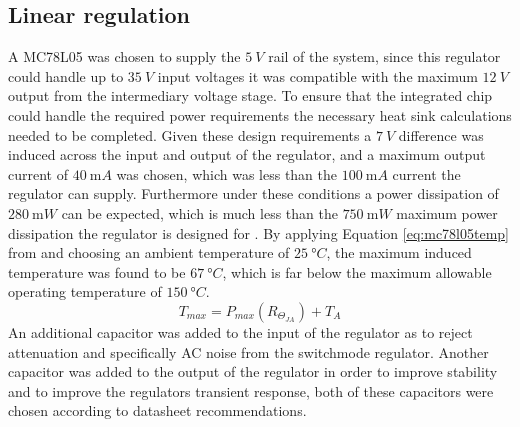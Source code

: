 \subsection{Linear regulation}
A MC78L05 was chosen to supply the $\SI{5}{V}$ rail of the system, since this regulator could handle up to $\SI{35}{V}$ input voltages it was compatible with the maximum $\SI{12}{V}$ output from the intermediary voltage stage. To ensure that the integrated chip could handle the required power requirements the necessary heat sink calculations needed to be completed. \newline 
Given these design requirements a $\SI{7}{V}$ difference was induced across the input and output of the regulator, and a maximum output current of $\SI{40}{\milli A}$ was chosen, which was less than the $\SI{100}{\milli A}$ current the regulator can supply. Furthermore under these conditions a power dissipation of $\SI{280}{\milli W}$ can be expected, which is much less than the $\SI{750}{\milli W}$ maximum power dissipation the regulator is designed for \cite{reg78L05:2002}. By applying Equation \ref{eq:mc78l05temp} from \cite{Perold:2019} and choosing an ambient temperature of $\SI{25}{\degree C}$, the maximum induced temperature was found to be $\SI{67}{\degree C}$, which is far below the maximum allowable operating temperature of $\SI{150}{\degree C}$.\newline
\begin{equation}
   T_{max} = P_{max}(R_{\Theta _{JA}}) + T_{A}
   \label{eq:mc78l05temp}
\end{equation}
An additional capacitor was added to the input of the regulator as to reject attenuation and specifically AC noise from the switchmode regulator. Another capacitor was added to the output of the regulator in order to improve stability and to improve the regulators transient response, both of these capacitors were chosen according to datasheet recommendations.

